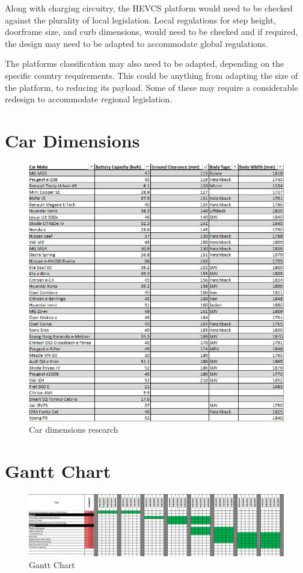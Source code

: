 \documentclass [12pt]{article}
\begin{document}
Along with charging circuitry, the HEVCS platform would need to be checked against the plurality of local legislation.
Local regulations for step height, doorframe size, and curb dimensions, would need to be checked and if required, the design may need to be adapted to accommodate global regulations.


The platforms classification may also need to be adapted, depending on the specific country requirements.
This could be anything from adapting the size of the platform, to reducing its payload.
Some of these may require a considerable redesign to accommodate regional legislation.
\newpage



\newpage
\appendix

\section{Car Dimensions}\label{app:Car_Dimensions}

\begin{figure}[H]
    \centerline{\includegraphics[width=1\textwidth]{CarDimensions.png}}
    \caption{Car dimensions research}
    \label{fig:CarDimensions}
\end{figure}

\section{Gantt Chart}\label{app:Gantt_Chart}

\begin{figure}[H]
    \centerline{\includegraphics[width=1\textwidth]{GanttChart.png}}
    \caption{Gantt Chart}
    \label{fig:GanttChart}
\end{figure}
\end{document}
